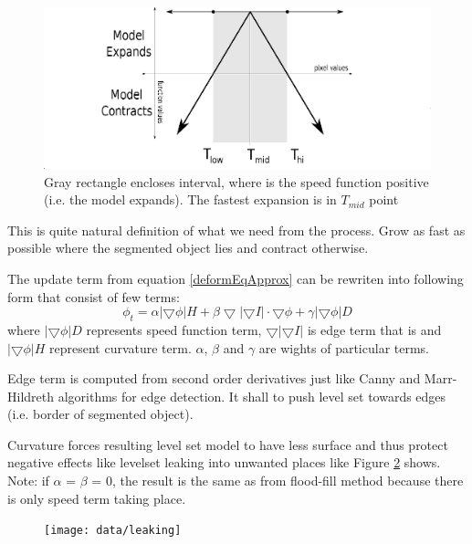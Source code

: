 \begin{figure}
    \centering
    \includegraphics[width=\textwidth]{data/speedFunction}
    \caption[Graph of thresholding based speed function]{Gray rectangle encloses interval, where is the speed function positive (i.e. the model expands). The fastest expansion is in $T_{mid}$ point}
    \label{fg:speedFunction}
\end{figure}

This is quite natural definition of what we need from the process. Grow as fast as possible where the segmented object lies and contract otherwise.

The update term from equation \ref{deformEqApprox} can be rewriten into following form that consist of few terms:
\begin{equation}
\phi_t = \alpha |\bigtriangledown \phi| H + \beta
\bigtriangledown|\bigtriangledown I|\cdot \bigtriangledown \phi +
\gamma|\bigtriangledown \phi|D
\end{equation}
where $|\bigtriangledown \phi|D$ represents speed function term, $\bigtriangledown|\bigtriangledown I|$ is edge term that is and $|\bigtriangledown \phi| H$ represent curvature term. $\alpha$, $\beta$ and $\gamma$ are wights of particular terms.

Edge term is computed from second order derivatives just like Canny and Marr-Hildreth algorithms for edge detection. It shall to push level set towards edges (i.e. border of segmented object).

Curvature forces resulting level set model to have less surface and thus protect
negative effects like levelset leaking into unwanted places like Figure
\ref{fg:leaking} shows. Note: if $\alpha$ = $\beta$ = 0, the result is the same
as from flood-fill method because there is only speed term taking place.

\begin{figure}
    \centering
    \texttt{[image: data/leaking]}
    \caption[Leaking of segmentaion into unwanted places]{}
    \label{fg:leaking}
\end{figure}


